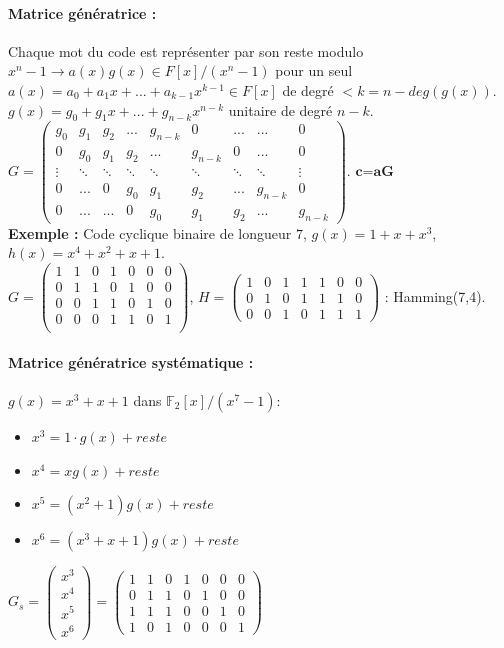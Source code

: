 \documentclass[11pt,a4paper]{report}
\begin{document}
\paragraph*{Matrice génératrice :} Chaque mot du code est représenter par son reste modulo $x^n-1 \rightarrow a(x)g(x)\in F[x]/(x^n-1)$ pour un seul $a(x)=a_0+a_1x+...+a_{k-1}x^{k-1}\in F[x]$ de degré $< k = n-deg(g(x))$. $g(x) = g_0+g_1x+...+g_{n-k}x^{n-k}$ unitaire de degré $n-k$.
$G = \begin{pmatrix}
g_0 & g_1 & g_2 & ... & g_{n-k} & 0 & ... & ... & 0 \\
0   & g_0 & g_1 & g_2 & ... & g_{n-k} & 0 & ... & 0 \\
\vdots & \ddots & \ddots & \ddots & \ddots & \ddots & \ddots & \ddots & \vdots \\
0 & ... & 0 & g_0 & g_1 & g_2 & ... & g_{n-k} & 0 \\
0 & ... & ... & 0 & g_0 & g_1 & g_2 & ... & g_{n-k}
\end{pmatrix}$. $\textbf{c=aG}$\\\textbf{Exemple :} Code cyclique binaire de longueur $7$, $g(x)=1+x+x^3$, $h(x)=x^4+x^2+x+1$.\\$G=\begin{pmatrix}
1&1&0&1&0&0&0\\
0&1&1&0&1&0&0\\
0&0&1&1&0&1&0\\
0&0&0&1&1&0&1\\
\end{pmatrix}$, $H=\begin{pmatrix}
1&0&1&1&1&0&0\\
0&1&0&1&1&1&0\\
0&0&1&0&1&1&1
\end{pmatrix}$ : Hamming(7,4).

\paragraph*{Matrice génératrice systématique :} $g(x)=x^3+x+1$ dans $\mathbb{F}_2[x]/(x^7-1)$:

\begin{minipage}{0.45\textwidth}
\begin{itemize}
    \item $x^3=1\cdot g(x) + reste$
    \item $x^4=xg(x)+reste$
    \item $x^5=(x^2+1)g(x)+reste$
    \item $x^6=(x^3+x+1)g(x)+reste$
\end{itemize}
\end{minipage}
\begin{minipage}{0.45\textwidth}
$G_s=\begin{pmatrix}x^3\\x^4\\x^5\\x^6\end{pmatrix}=
\begin{pmatrix}
1&1&0&1&0&0&0\\
0&1&1&0&1&0&0\\
1&1&1&0&0&1&0\\
1&0&1&0&0&0&1
\end{pmatrix}$
\end{minipage}
\end{document}
